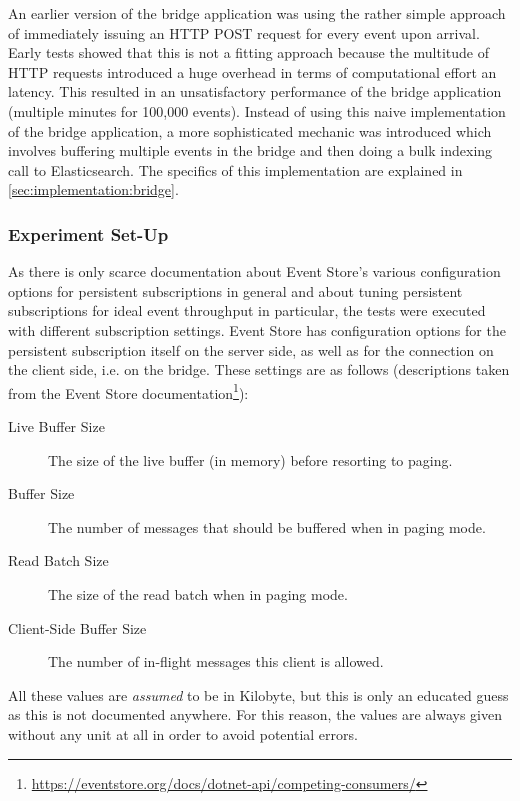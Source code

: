 An earlier version of the bridge application was using the rather simple approach of immediately issuing an \ac{HTTP} POST request for every event upon arrival.
Early tests showed that this is not a fitting approach because the multitude of HTTP requests introduced a huge overhead in terms of computational effort an latency.
This resulted in an unsatisfactory performance of the bridge application (multiple minutes for 100,000 events).
Instead of using this naive implementation of the bridge application, a more sophisticated mechanic was introduced which involves buffering multiple events in the bridge and then doing a bulk indexing call to Elasticsearch.
The specifics of this implementation are explained in \cref{sec:implementation:bridge}.

\subsubsection{Experiment Set-Up}

As there is only scarce documentation about Event Store's various configuration options for persistent subscriptions in general and about tuning persistent subscriptions for ideal event throughput in particular, the tests were executed with different subscription settings.
Event Store has configuration options for the persistent subscription itself on the server side, as well as for the connection on the client side, i.e. on the bridge.
These settings are as follows (descriptions taken from the Event Store documentation\footnote{\url{https://eventstore.org/docs/dotnet-api/competing-consumers/}}):

\begin{description}
\item[Live Buffer Size] The size of the live buffer (in memory) before resorting to paging.
\item[Buffer Size] The number of messages that should be buffered when in paging mode.
\item[Read Batch Size] The size of the read batch when in paging mode.
\item[Client-Side Buffer Size] The number of in-flight messages this client is allowed.
\end{description}

All these values are \emph{assumed} to be in Kilobyte, but this is only an educated guess as this is not documented anywhere.
For this reason, the values are always given without any unit at all in order to avoid potential errors.

